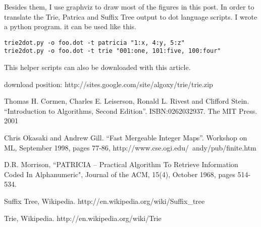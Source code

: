 \documentclass{article}
\begin{document}
Besides them, I use graphviz to draw most of the figures in this post. In order to
translate the Trie, Patrica and Suffix Tree output to dot language scripts. I wrote a python program.
it can be used like this.

\begin{verbatim}
trie2dot.py -o foo.dot -t patricia "1:x, 4:y, 5:z"
trie2dot.py -o foo.dot -t trie "001:one, 101:five, 100:four"
\end{verbatim}

This helper scripts can also be downloaded with this article.

download position: http://sites.google.com/site/algoxy/trie/trie.zip

\begin{thebibliography}{99}

Thomas H. Cormen, Charles E. Leiserson, Ronald L. Rivest and Clifford Stein. 
``Introduction to Algorithms, Second Edition''. ISBN:0262032937. The MIT Press. 2001

Chris Okasaki and Andrew Gill. ``Fast Mergeable Integer
Maps''. Workshop on ML, September 1998, pages 77-86, http://www.cse.ogi.edu/~andy/pub/finite.htm

D.R. Morrison, ``PATRICIA -- Practical Algorithm To Retrieve  Information Coded In Alphanumeric", Journal of the ACM, 15(4), October 1968, pages 514-534.

Suffix Tree, Wikipedia. http://en.wikipedia.org/wiki/Suffix\_tree

Trie, Wikipedia. http://en.wikipedia.org/wiki/Trie

\end{thebibliography}

\ifx\wholebook\relax\else
\end{document}
